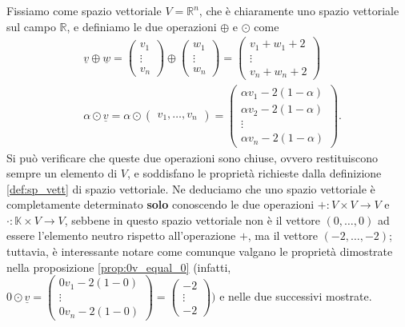 \begin{example}
    Fissiamo come spazio vettoriale $V = \mathbb{R}^n$, che è chiaramente uno spazio vettoriale sul campo $\mathbb{R}$, e definiamo le due operazioni $\oplus$ e $\odot$ come
    \begin{align}
        &\underline{v} \oplus \underline{w} = \begin{pmatrix} v_1 \\ \vdots \\ v_n \end{pmatrix} \oplus \begin{pmatrix} w_1 \\ \vdots \\ w_n \end{pmatrix} = \begin{pmatrix} v_1 + w_1 + 2 \\ \vdots \\ v_n + w_n +2 \end{pmatrix} \\
        &\alpha \odot \underline{v} = \alpha \odot \begin{pmatrix} v_1, \ldots, v_n \end{pmatrix} = \begin{pmatrix} \alpha v_1 - 2(1-\alpha) \\ \alpha v_2 - 2(1-\alpha) \\ \vdots \\ \alpha v_n - 2(1-\alpha) \end{pmatrix}.
    \end{align}
    Si può verificare che queste due operazioni sono chiuse, ovvero restituiscono sempre un elemento di $V$, e soddisfano le proprietà richieste dalla definizione \ref{def:sp_vett} di spazio vettoriale. Ne deduciamo che uno spazio vettoriale è completamente determinato \textbf{solo} conoscendo le due operazioni $+: V \times V \to V$ e $\cdot: \mathbb{K} \times V \to V$, sebbene in questo spazio vettoriale non è il vettore $(0, \ldots, 0)$ ad essere l'elemento neutro rispetto all'operazione $+$, ma il vettore $(-2, \ldots, -2)$; tuttavia, è interessante notare come
    comunque valgano le proprietà dimostrate nella proposizione \ref{prop:0v_equal_0} (infatti, $0 \odot \underline{v} = \begin{pmatrix} 0 v_1 - 2(1-0) \\ \vdots \\ 0v_n - 2(1-0) \end{pmatrix} = \begin{pmatrix} -2 \\ \vdots \\ -2 \end{pmatrix} )$ e nelle due successivi mostrate.
\end{example}
